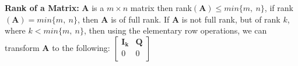 {\bf Rank of a Matrix:} $\mathbf{A}$ is a $m \times n$ matrix then rank$(\mathbf{A}) \le min\{m,~n\}$, if rank$(\mathbf{A}) = min\{m,~n\}$, then $\mathbf{A}$ is of full rank.  If $\mathbf{A}$ is not full rank, but of rank $k$, where $k < min\{m,~n\}$, then using the elementary row operations, we can transform $\mathbf{A}$ to the following:
$\left[
   \begin{array}{cc}
     \mathbf{I_k} & \mathbf{Q}  \\
     0            & 0 \\
\end{array} \right]$

\begin{comment}
\bigskip {\bf Simultaneous Linear Equations}

\bigskip Consider the system $\mathbf{A} \mathbf{x} = \mathbf{b}$, where $\mathbf{A}$ is a $m \times n$ matrix of rank $m$ and $m \le n$. We can partition $\mathbf{A}$ such that $\mathbf{A} = [\mathbf{B}, \mathbf{N}]$, where
\begin{itemize}
\item the {\it basis matrix} $\mathbf{B}$ is a nonsingular (i.e., it consists of $m$ linearly dependent columns of $\mathbf{A}$) $m \times m$ matrix.
\item the {\it nonbasic matrix} $\mathbf{N}$ is a $m \times n-m$ matrix
\end{itemize}

The vector $\mathbf{x}$ can be divided in a similar way (each column corresponds to a variable), yielding $\mathbf{x_B}$ and $\mathbf{x_N}$. \\

We can write our system as follows: 
$$\mathbf{B} \mathbf{x_B} + \mathbf{N} \mathbf{x_N} = \mathbf{b}.$$ 
$$\mathbf{B} \mathbf{x_B}  = \mathbf{b}-  \mathbf{N} \mathbf{x_N}.$$ 
Premultiplying by $\mathbf{B^{-1}}$ yields:  
$$\mathbf{x_B} = \mathbf{B^{-1}}\mathbf{b} - \mathbf{B^{-1}} \mathbf{N} \mathbf{x_N}.$$ 

By setting $\mathbf{x_N} = \mathbf{0}$ and solving we (potentially) find a {\it basic feasible solution} to the system, which corresponds to an extreme point of the feasible region, remember that the nonbasic variables $\mathbf{x_N} = \mathbf{0}$ represent the defining hyperplanes for a solution. For any set of $m$ variables, the result can be:

\begin{enumerate}
\item a basic feasible solution, $\mathbf{x_B} \ge \mathbf{0}$.
\item a basic infeasible solution, some $x \in \mathbf{x_B} \le 0$.
\item a set of linearly dependent columns that does not span the $m$-space.
\end{enumerate}


\end{comment}
